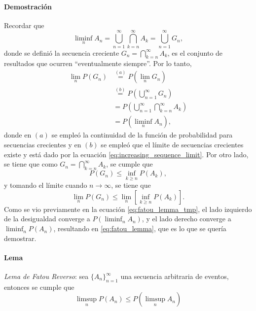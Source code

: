 \documentclass[a4paper]{report}
\begin{document}
\paragraph{Demostración} Recordar que 
\[
 \liminf_n A_n = \bigcup_{n=1}^{\infty }\bigcap_{k=n}^{\infty }A_k = \bigcup_{n=1}^{\infty}G_n,
\]
donde se definió la secuencia creciente \(G_n=\bigcap_{k=n}^{\infty }A_k\), es el conjunto de resultados que ocurren ``eventualmente siempre''. Por lo tanto,
\begin{align}\label{eq:fatou_lemma_tmp}
 \lim_n P\left(G_n\right)&\overset{(a)}{=}P\left(\lim_n G_n\right)\nonumber\\
   &\overset{(b)}{=}P\left(\bigcup_{n=1}^{\infty } G_n\right)\nonumber\\
   &=P\left(\bigcup_{n=1}^{\infty } \bigcap_{k=n}^{\infty }A_k\right)\nonumber\\
   &=P\left(\liminf_n A_n\right),
\end{align}
donde en \((a)\) se empleó la continuidad de la función de probabilidad para secuencias crecientes y en \((b)\) se empleó que el límite de secuencias crecientes existe y está dado por la ecuación \ref{eq:increasing_sequence_limit}. Por otro lado, se tiene que como \(G_n=\bigcap_{k=n}^{\infty }A_k\), se cumple que
\[
 P(G_n)\leq \inf_{k\geq n} P(A_k),
\]
y tomando el límite cuando \(n\to\infty\), se tiene que
\[
 \lim_n P(G_n)\leq \lim_n\left[\inf_{k\geq n} P(A_k)\right].
\]
Como se vio previamente en la ecuación \ref{eq:fatou_lemma_tmp}, el lado izquierdo de la desigualdad converge a \(P\left(\liminf_n A_n\right)\), y el lado derecho converge a \(\liminf_n P(A_n)\), resultando en \ref{eq:fatou_lemma}, que es lo que se quería demostrar.

\paragraph{Lema} \emph{Lema de Fatou Reverso}: sea \(\{A_n\}_{n=1}^{\infty}\) una secuencia arbitraria de eventos, entonces se cumple que
\begin{equation}\label{eq:reverse_fatou_lemma}
  \limsup_n P\left(A_n\right)\leq P\left(\limsup_n A_n\right)
\end{equation}
\end{document}
